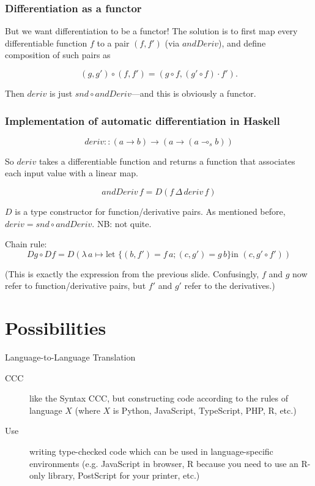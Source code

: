 \documentclass[10pt]{beamer}
\newcommand{\lamf}[2]{\ensuremath{\lambda\, #1 \mapsto #2}}
\newcommand{\delprod}[2]{\ensuremath{#1\,\Delta\,#2}}
\theoremstyle{definition}
\theoremstyle{remark}
\numberwithin{equation}{section}
\begin{document}
\begin{frame}[fragile]
  \frametitle{Differentiation as a functor}

  But we want differentiation to be a functor! The solution is to first map
  every differentiable function $f$ to a pair $(f,f')$ (via $andDeriv$), and
  define composition of such pairs as

  \[
    (g,g') \circ (f,f') = (g \circ f, (g' \circ f) \cdot f').
  \]

  Then $deriv$ is just $snd \circ andDeriv$---and this is obviously a functor.
  
\end{frame}

\begin{frame}[fragile]
  \frametitle{Implementation of automatic differentiation in Haskell}

  \[
    deriv :: (a \rightarrow b) \rightarrow (a \rightarrow (a \multimap_s b))
  \]

  So $deriv$ takes a differentiable function and returns a function that
  associates each input value with a linear map.

  \[
    andDeriv\,f = D (\delprod{f}{deriv\, f})
  \]

  $D$ is a type constructor for function/derivative pairs. As mentioned before,
  $deriv = snd \circ andDeriv$. {\small NB: not quite.}

  Chain rule:
  \[
    Dg \circ Df = D (\lamf{a}{\text{let } \{(b, f') = f\,a; (c,g') = g\,b\} \text{
        in }
    (c, g' \circ f')})
\]

(This is exactly the expression from the previous slide. Confusingly, $f$ and
$g$ now refer to function/derivative pairs, but $f'$ and $g'$ refer to the
derivatives.)
\end{frame}

\section{Possibilities} %

\begin{frame}[fragile]{Language-to-Language Translation}
  \begin{description}
  \item[CCC] like the Syntax CCC, but constructing code according to the rules of language $X$ (where $X$ is Python, JavaScript, TypeScript, PHP, R, etc.)
  \item[Use] writing type-checked code which can be used in language-specific environments (e.g. JavaScript in browser, R because you need to use an R-only library, PostScript for your printer, etc.)
  \end{description}
\end{frame}
\end{document}
